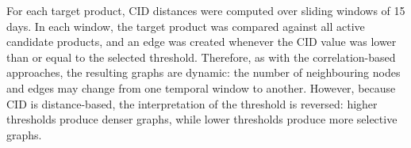 For each target product, CID distances were computed over sliding windows of 15 days. In each window, the target product was compared against all active candidate products, and an edge was created whenever the CID value was lower than or equal to the selected threshold. Therefore, as with the correlation-based approaches, the resulting graphs are dynamic: the number of neighbouring nodes and edges may change from one temporal window to another. However, because CID is distance-based, the interpretation of the threshold is reversed: higher thresholds produce denser graphs, while lower thresholds produce more selective graphs.



